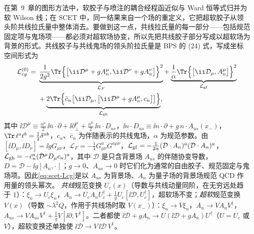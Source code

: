 在第~9~章的图形方法中，软胶子与喷注的耦合经程函近似与 Ward 恒等式归并为软 Wilson 线；在 SCET 中，同一结果来自一个场的重定义，它把超软胶子从领头阶共线拉氏量中整体消去。要做到这一点，共线拉氏量的每一部分——包括规范固定项与鬼场项——都必须对超软场协变，所以先把共线胶子部分写成以超软场为背景的形式。共线胶子与共线鬼场的领头阶拉氏量是 BPS 的 (24) 式\cite{BauerPirjolStewart2002}，写成坐标空间形式为
\begin{equation}\label{eq:scet-Lcg}
\begin{split}
\mathcal L^{(0)}_{cg}={}&\underbrace{\frac{1}{2g^2}\Tr\Big\{\big[\ii\mathcal D^\mu+gA_n^\mu,\ii\mathcal D^\nu+gA_n^\nu\big]\Big\}^2}_{\mathcal L_F}
+\underbrace{\frac1\alpha\Tr\Big\{\big[\ii\mathcal D_\mu,A_n^\mu\big]\Big\}^2}_{\mathcal L_{\rm gf}}\\
&+\underbrace{2\Tr\Big\{\bar c_n\big[\ii\mathcal D_\mu,\big[\ii\mathcal D^\mu+gA_n^\mu,c_n\big]\big]\Big\}}_{\mathcal L_{\rm gh}},
\end{split}
\end{equation}
其中 $\ii\mathcal D^\mu\equiv\frac{n^\mu}{2}\,\ii\bar n\cdot\partial+\ii\partial_\perp^\mu+\frac{\bar n^\mu}{2}\,\ii n\cdot D_{us}$，$\ii n\cdot D_{us}\equiv\ii n\cdot\partial+g\,n\cdot A_{us}(x_-)$，$\Tr\,t^at^b=\frac12\delta^{ab}$，$c_n$、$\bar c_n$ 为伴随表示的共线鬼场，$\alpha$ 为规范参数。由 $[\ii D_\mu,\ii D_\nu]=\ii gG_{\mu\nu}$，$\mathcal L_F=-\frac14G^a_{\mu\nu}G^{a\mu\nu}$，$\mathcal L_{\rm gf}=-\frac{1}{2\alpha}(\mathcal D\cdot A_n)^a(\mathcal D\cdot A_n)^a$，$\mathcal L_{\rm gh}=-\bar c_n^a(\mathcal D^\mu D_{\mu}c_n)^a$，其中 $\mathcal D$ 是只含背景场 $A_{us}$ 的伴随协变导数，$D=\mathcal D-\ii g[A_n,\cdot\,]$；$g\to0$、$A_{us}\to0$ 时它们化为通常的自由胶子、规范固定与鬼场项。因此\cref{eq:scet-Lcg}是以 $A_{us}$ 为背景场、$A_n$ 为量子场的背景场规范 QCD 作用量的领头幂次\cite{BauerPirjolStewart2002}。%
\emph{共线}规范变换 $U_c(x)$（导数与共线动量同阶，在无穷远处趋于 $1$）：$\xi_n\to U_c\xi_n$，$A_n\to U_cA_nU_c^\dagger+\frac1gU_c[\ii\mathcal D,U_c^\dagger]$，超软场不变；\emph{超软}规范变换 $V(x)$（导数 $\sim\lambda^2Q$，作用于共线场时取 $V(x_-)$）：$\xi_n\to V\xi_n$，$A_n\to VA_nV^\dagger$，$A_{us}\to VA_{us}V^\dagger+\frac1gV[\ii\partial,V^\dagger]$。二者都使 $\ii\mathcal D+gA_n\to U(\ii\mathcal D+gA_n)U^\dagger$（$U=U_c$ 或 $V$），超软变换还单独使 $\ii\mathcal D\to V\,\ii\mathcal D\,V^\dagger$。

